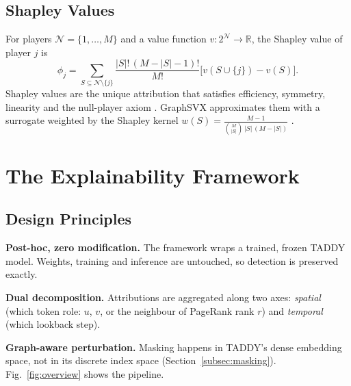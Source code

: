\documentclass[conference]{IEEEtran}
\begin{document}
\subsection{Shapley Values}
For players $\mathcal{N}=\{1,\ldots,M\}$ and a value function
$v:2^{\mathcal{N}}\to\mathbb{R}$, the Shapley value of player $j$ is
\begin{equation}
\phi_j=\sum_{S\subseteq\mathcal{N}\setminus\{j\}}
\frac{|S|!\,(M{-}|S|{-}1)!}{M!}\bigl[v(S\cup\{j\})-v(S)\bigr].
\label{eq:shapley}
\end{equation}
Shapley values are the unique attribution that satisfies efficiency, symmetry,
linearity and the null-player axiom \cite{shapley1953value}. GraphSVX
\cite{duval2021graphsvx} approximates them with a surrogate weighted by the
Shapley kernel
$w(S)=\frac{M-1}{\binom{M}{|S|}\,|S|\,(M-|S|)}$ \cite{lundberg2017shap}.

\section{The Explainability Framework}
\label{sec:framework}

\subsection{Design Principles}
\noindent\textbf{Post-hoc, zero modification.} The framework wraps a trained,
frozen TADDY model. Weights, training and inference are untouched, so detection
is preserved exactly.

\noindent\textbf{Dual decomposition.} Attributions are aggregated along two
axes: \emph{spatial} (which token role: $u$, $v$, or the neighbour of PageRank
rank $r$) and \emph{temporal} (which lookback step).

\noindent\textbf{Graph-aware perturbation.} Masking happens in TADDY's dense
embedding space, not in its discrete index space
(Section~\ref{subsec:masking}). Fig.~\ref{fig:overview} shows the pipeline.
\end{document}
